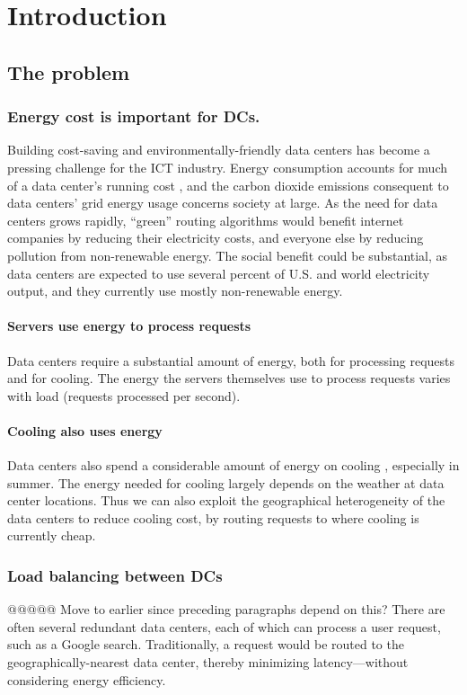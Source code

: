 \documentclass{acm_proc_article-sp}
\begin{document}
\section{Introduction}


\subsection{The problem}
	\subsubsection{Energy cost is important for DCs.}
		Building cost-saving and environmentally-friendly data centers has become a pressing challenge for the ICT industry.
		Energy consumption accounts for much of a data center’s running cost \cite{datacenter}, and the carbon dioxide emissions consequent to data centers’ grid energy usage concerns society at large.
		As the need for data centers grows rapidly,
		“green” routing algorithms would benefit internet companies by reducing their electricity costs, and everyone else by reducing pollution from non-renewable energy. The social benefit could be substantial, as data centers are expected to use several percent of U.S. and world electricity output, and they currently use mostly non-renewable energy.
		
		\paragraph{Servers use energy to process requests}
			Data centers require a substantial amount of energy, both for processing requests and for cooling. The energy the servers themselves use to process requests varies with load (requests processed per second).
		\paragraph{Cooling also uses energy}
			Data centers also spend a considerable amount of energy on cooling \cite{datacenter}, especially in summer. The energy needed for cooling largely depends on the weather at data center locations. Thus we can also exploit the geographical heterogeneity of the data centers to reduce cooling cost, by routing requests to where cooling is currently cheap.
	\subsubsection{Load balancing between DCs}
		@@@@@ Move to earlier since preceding paragraphs depend on this?
		There are often several redundant data centers, each of which can process a user request, such as a Google search. Traditionally, a request would be routed to the geographically-nearest data center, thereby minimizing latency—without considering energy efficiency.
\end{document}
